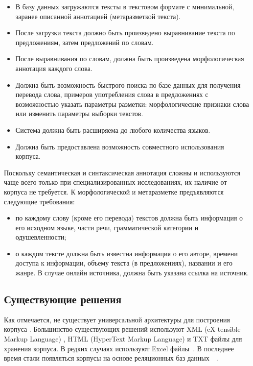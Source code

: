 \begin{itemize}[label=---]
	\item В базу данных загружаются тексты в текстовом формате с минимальной, заранее описанной аннотацией (метаразметкой текста).
	
	\item После загрузки текста должно быть произведено выравнивание текста по предложениям, затем предложений по словам.
	
	\item После выравнивания по словам, должна быть произведена морфологическая аннотация каждого слова.
	
	\item Должна быть возможность быстрого поиска по базе данных для получения перевода слова, примеров употребления слова в предложениях с возможностью указать параметры разметки: морфологические признаки слова или изменить параметры выборки текстов.
	
	\item Система должна быть расширяема до любого количества языков.
	
	\item Должна быть предоставлена возможность совместного использования корпуса.
\end{itemize}

Поскольку семантическая и синтаксическая аннотация сложны и используются чаще всего только при специализированных исследованиях, их наличие от корпуса не требуется. 
К морфологической и метаразметке предъявляются следующие требования:

\begin{itemize}[label=---]
	\item по каждому слову (кроме его перевода) текстов должна быть информация о его исходном языке, части речи, грамматической категории и одушевленности;
	
	\item о каждом тексте должна быть известна информация о его авторе, времени доступа к информации, объему текста (в предложениях), названии и его жанре. 
	В случае онлайн источника, должна быть указана ссылка на источник.
\end{itemize}


\subsection{Существующие решения}

Как отмечается, не существует универсальной архитектуры для построения корпуса \cite{khosla-survey-report-2018}. 
Большинство существующих решений используют XML (eX-tensible Markup Language) \cite{xml}, HTML (HyperText Markup Language) \cite{html} и TXT файлы для хранения корпуса. 
В редких случаях используют Excel файлы~\cite{khosla-survey-report-2018}. 
В последнее время стали появляться корпусы на основе реляционных баз данных~\cite{tao-ruschi-corpus-2015}~\cite{pezik-polish-2011}.

